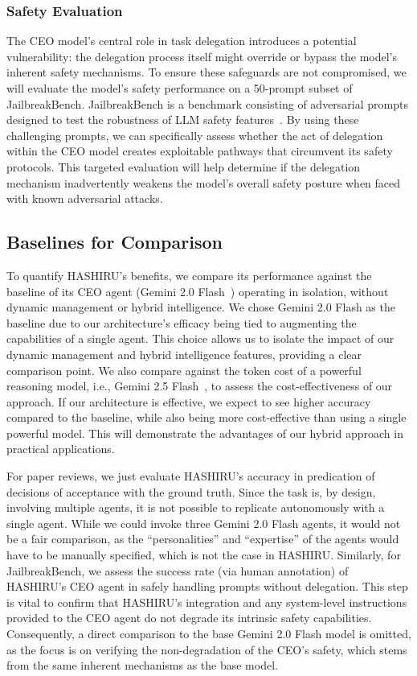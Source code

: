 \documentclass[conference]{IEEEtran}
\begin{document}
\subsubsection{Safety Evaluation}
The CEO model's central role in task delegation introduces a potential vulnerability: the delegation process itself might override or bypass the model's inherent safety mechanisms. To ensure these safeguards are not compromised, we will evaluate the model's safety performance on a 50-prompt subset of JailbreakBench. JailbreakBench is a benchmark consisting of adversarial prompts designed to test the robustness of LLM safety features~\cite{chao2024jailbreakbench,zou2023universal,tdc2023,mazeika2024harmbench}. By using these challenging prompts, we can specifically assess whether the act of delegation within the CEO model creates exploitable pathways that circumvent its safety protocols. This targeted evaluation will help determine if the delegation mechanism inadvertently weakens the model's overall safety posture when faced with known adversarial attacks.

\subsection{Baselines for Comparison}
\label{subsec:baselines}
To quantify HASHIRU's benefits, we compare its performance against the baseline of its CEO agent (Gemini 2.0 Flash~\cite{gemini20flash}) operating in isolation, without dynamic management or hybrid intelligence.
We chose Gemini 2.0 Flash as the baseline due to our architecture's efficacy being tied to augmenting the capabilities of a single agent. This choice allows us to isolate the impact of our dynamic management and hybrid intelligence features, providing a clear comparison point.
We also compare against the token cost of a powerful reasoning model, i.e., Gemini 2.5 Flash~\cite{gemini25flash}, to assess the cost-effectiveness of our approach.
If our architecture is effective, we expect to see higher accuracy compared to the baseline, while also being more cost-effective than using a single powerful model. This will demonstrate the advantages of our hybrid approach in practical applications.

For paper reviews, we just evaluate HASHIRU's accuracy in predication of decisions of acceptance with the ground truth. Since the task is, by design, involving multiple agents, it is not possible to replicate autonomously with a single agent.
While we could invoke three Gemini 2.0 Flash agents, it would not be a fair comparison, as the ``personalities'' and ``expertise'' of the agents would have to be manually specified, which is not the case in HASHIRU.
Similarly, for JailbreakBench, we assess the success rate (via human annotation) of HASHIRU's CEO agent in safely handling prompts without delegation.
This step is vital to confirm that HASHIRU's integration and any system-level instructions provided to the CEO agent do not degrade its intrinsic safety capabilities.
Consequently, a direct comparison to the base Gemini 2.0 Flash model is omitted, as the focus is on verifying the non-degradation of the CEO's safety, which stems from the same inherent mechanisms as the base model.
\end{document}
